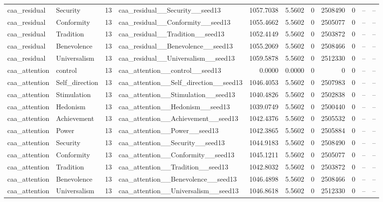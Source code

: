 \begin{tabular}{llrlrrrrrrr}
caa\_residual & Security & 13 & caa\_residual\_\_Security\_\_seed13 & 1057.7038 & 5.5602 & 0 & 2508490 & 0 & -- & -- \\
caa\_residual & Conformity & 13 & caa\_residual\_\_Conformity\_\_seed13 & 1055.4662 & 5.5602 & 0 & 2505077 & 0 & -- & -- \\
caa\_residual & Tradition & 13 & caa\_residual\_\_Tradition\_\_seed13 & 1052.4149 & 5.5602 & 0 & 2503872 & 0 & -- & -- \\
caa\_residual & Benevolence & 13 & caa\_residual\_\_Benevolence\_\_seed13 & 1055.2069 & 5.5602 & 0 & 2508466 & 0 & -- & -- \\
caa\_residual & Universalism & 13 & caa\_residual\_\_Universalism\_\_seed13 & 1059.5878 & 5.5602 & 0 & 2512330 & 0 & -- & -- \\
caa\_attention & control & 13 & caa\_attention\_\_control\_\_seed13 & 0.0000 & 0.0000 & 0 & 0 & 0 & -- & -- \\
caa\_attention & Self\_direction & 13 & caa\_attention\_\_Self\_direction\_\_seed13 & 1046.4053 & 5.5602 & 0 & 2507983 & 0 & -- & -- \\
caa\_attention & Stimulation & 13 & caa\_attention\_\_Stimulation\_\_seed13 & 1040.4826 & 5.5602 & 0 & 2502838 & 0 & -- & -- \\
caa\_attention & Hedonism & 13 & caa\_attention\_\_Hedonism\_\_seed13 & 1039.0749 & 5.5602 & 0 & 2500440 & 0 & -- & -- \\
caa\_attention & Achievement & 13 & caa\_attention\_\_Achievement\_\_seed13 & 1042.4376 & 5.5602 & 0 & 2505532 & 0 & -- & -- \\
caa\_attention & Power & 13 & caa\_attention\_\_Power\_\_seed13 & 1042.3865 & 5.5602 & 0 & 2505884 & 0 & -- & -- \\
caa\_attention & Security & 13 & caa\_attention\_\_Security\_\_seed13 & 1044.9183 & 5.5602 & 0 & 2508490 & 0 & -- & -- \\
caa\_attention & Conformity & 13 & caa\_attention\_\_Conformity\_\_seed13 & 1045.1211 & 5.5602 & 0 & 2505077 & 0 & -- & -- \\
caa\_attention & Tradition & 13 & caa\_attention\_\_Tradition\_\_seed13 & 1042.8032 & 5.5602 & 0 & 2503872 & 0 & -- & -- \\
caa\_attention & Benevolence & 13 & caa\_attention\_\_Benevolence\_\_seed13 & 1046.4898 & 5.5602 & 0 & 2508466 & 0 & -- & -- \\
caa\_attention & Universalism & 13 & caa\_attention\_\_Universalism\_\_seed13 & 1046.8618 & 5.5602 & 0 & 2512330 & 0 & -- & -- \\
\bottomrule
\end{tabular}

